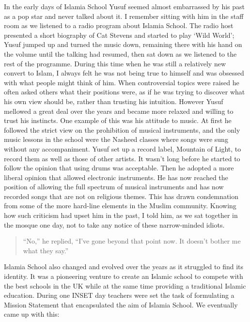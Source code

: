 \documentclass[12pt]{memoir}
\begin{document}
In the early days of Islamia School Yusuf seemed almost embarrassed
by his past as a pop star and never talked about it.
I remember sitting with him in the staff room
as we listened to a radio program about Islamia School.
The radio host presented a short biography of Cat Stevens
and started to play ‘Wild World’; Yusuf jumped up and turned the music down,
remaining there with his hand on the volume until the talking had resumed,
then sat down as we listened to the rest of the programme.
During this time when he was still a relatively new convert to Islam,
I always felt he was not being true to himself
and was obsessed with what people might think of him.
When controversial topics were raised he often asked others
what their positions were,
as if he was trying to discover what his own view should be,
rather than trusting his intuition.
However Yusuf mellowed a great deal over the years
and became more relaxed and willing to trust his instincts.
One example of this was his attitude to music.
At first he followed the strict view on the prohibition of musical instruments,
and the only music lessons in the school were the Nasheed classes
where songs were sung without any accompaniment.
Yusuf set up a record label, Mountain of Light,
to record them as well as those of other artists.
It wasn’t long before he started to follow the opinion
that using drums was acceptable.
Then he adopted a more liberal opinion that allowed electronic instruments.
He has now reached the position of allowing the full spectrum of musical
instruments and has now recorded songs that are not on religious themes.
This has drawn condemnation from some of the more
hard-line elements in the Muslim community.
Knowing how such criticism had upset him in the past, I told him,
as we sat together in the mosque one day,
not to take any notice of these narrow-minded idiots.

\begin{quote}
“No,” he replied, “I’ve gone beyond that point now.
It doesn’t bother me what they say.”
\end{quote}

Islamia School also changed and evolved over the years
as it struggled to find its identity.
It was a pioneering venture to create an Islamic school
to compete with the best schools in the UK
while at the same time providing a traditional Islamic education.
During one INSET day teachers were set the task of formulating
a Mission Statement that encapsulated the aim of Islamia School.
We eventually came up with this:
\end{document}
